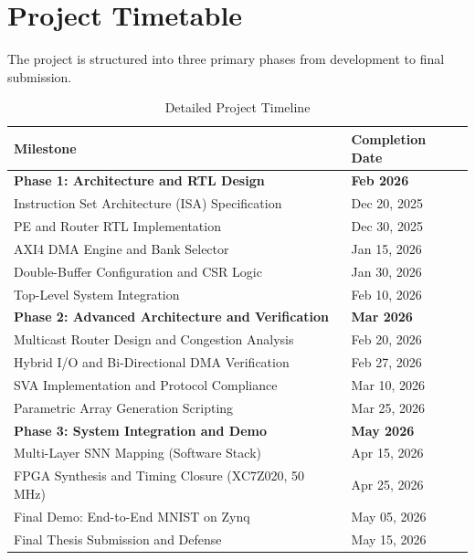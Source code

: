 \section{Project Timetable}

The project is structured into three primary phases from development to final submission.

\begin{table}[ht!]
\centering
\singlespacing
\begin{tabularx}{\textwidth}{|X|p{4cm}|}
\hline
\textbf{Milestone} & \textbf{Completion Date} \\
\hline
\hline
\rowcolor[gray]{0.9} \textbf{Phase 1: Architecture and RTL Design} & \textbf{Feb 2026} \\
\hline
Instruction Set Architecture (ISA) Specification & Dec 20, 2025 \\
PE and Router RTL Implementation & Dec 30, 2025 \\
AXI4 DMA Engine and Bank Selector & Jan 15, 2026 \\
Double-Buffer Configuration and CSR Logic & Jan 30, 2026 \\
Top-Level System Integration & Feb 10, 2026 \\
\hline
\rowcolor[gray]{0.9} \textbf{Phase 2: Advanced Architecture and Verification} & \textbf{Mar 2026} \\
\hline
Multicast Router Design and Congestion Analysis & Feb 20, 2026 \\
Hybrid I/O and Bi-Directional DMA Verification & Feb 27, 2026 \\
SVA Implementation and Protocol Compliance & Mar 10, 2026 \\
Parametric Array Generation Scripting & Mar 25, 2026 \\
\hline
\rowcolor[gray]{0.9} \textbf{Phase 3: System Integration and Demo} & \textbf{May 2026} \\
\hline
Multi-Layer SNN Mapping (Software Stack) & Apr 15, 2026 \\
FPGA Synthesis and Timing Closure (XC7Z020, 50 MHz) & Apr 25, 2026 \\
Final Demo: End-to-End MNIST on Zynq & May 05, 2026 \\
Final Thesis Submission and Defense & May 15, 2026 \\
\hline
\end{tabularx}
\caption{Detailed Project Timeline}
\end{table}
